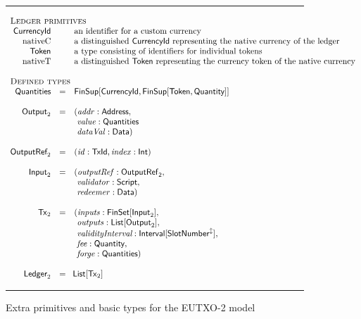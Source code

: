 \documentclass[a4paper]{article}
\renewcommand{\i}{\textit}  %
\newcommand{\s}{\textsf}  %
\newcommand{\msf}[1]{\ensuremath{\mathsf{#1}}}
\newcommand{\mi}[1]{\ensuremath{\mathit{#1}}}
\newcommand\rfskip{7pt}
\newenvironment{ruledfigure}[1]{\begin{figure}[#1]\hrule\vspace{\rfskip}}{\vspace{\rfskip}\hrule\end{figure}}
\newcommand{\List}[1]{\ensuremath{\s{List}[#1]}}
\newcommand{\FinSet}[1]{\ensuremath{\s{FinSet}[#1]}}
\newcommand{\Interval}[1]{\ensuremath{\s{Interval}[#1]}}
\newcommand{\extended}[1]{#1^\updownarrow}
\newcommand{\FinSup}[2]{\ensuremath{\s{FinSup}[#1,#2]}}
\newcommand{\script}{\ensuremath{\s{Script}}}
\newcommand{\TxId}{\ensuremath{\s{TxId}}}
\newcommand{\txrefid}{\mi{id}}
\newcommand{\Address}{\ensuremath{\s{Address}}}
\newcommand{\idx}{\mi{index}}
\newcommand{\inputs}{\mi{inputs}}
\newcommand{\outputs}{\mi{outputs}}
\newcommand{\forge}{\mi{forge}}
\newcommand{\fee}{\mi{fee}}
\newcommand{\addr}{\mi{addr}}
\newcommand{\val}{\mi{value}}  %
\newcommand{\validator}{\mi{validator}}
\newcommand{\redeemer}{\mi{redeemer}}
\newcommand{\dataval}{\mi{dataVal}}
\newcommand{\Data}{\ensuremath{\s{Data}}}
\newcommand{\outputref}{\mi{outputRef}}
\newcommand{\slotnum}{\ensuremath{\s{SlotNumber}}}
\newcommand{\eutxotx}{\msf{Tx}}
\newcommand{\qty}{\ensuremath{\s{Quantity}}}
\newcommand{\token}{\ensuremath{\s{Token}}}
\newcommand{\currency}{\ensuremath{\s{CurrencyId}}}
\newcommand{\nativeCur}{\ensuremath{\mathrm{nativeC}}}
\newcommand{\nativeTok}{\ensuremath{\mathrm{nativeT}}}
\newcommand{\qtymap}{\ensuremath{\s{Quantities}}}
\begin{document}
\begin{ruledfigure}{H}
  \begin{displaymath}
    \begin{array}{rll}
    \multicolumn{3}{l}{\textsc{Ledger primitives}}\\
    \currency  && \mbox{an identifier for a custom currency}\\
    \nativeCur && \mbox{a distinguished \currency{} representing the native currency of the ledger}\\
    \token     && \mbox{a type consisting of identifiers for individual tokens}\\
    \nativeTok && \mbox{a distinguished \token{} representing the currency token of the native currency}\\
    \\
    \multicolumn{3}{l}{\textsc{Defined types}}\\
    \qtymap   &=& \FinSup{\currency}{\FinSup{\token}{\qty}}\\
    \\
    \s{Output}_2 &=&(\addr: \Address,\\
                 & &\ \val: \qtymap\\
                 & &\ \dataval: \Data)\\
    \\
    \s{OutputRef}_2 &= &(\txrefid: \TxId, \idx: \s{Int})\\
    \\
    \s{Input}_2 &=&( \outputref: \sf{OutputRef}_2,\\
                & &\ \validator: \script,\\
                & &\ \redeemer: \Data)\\
    \\
    \eutxotx_2 &=&(\inputs: \FinSet{\s{Input}_2},\\
               & &\ \outputs: \List{\s{Output}_2},\\
               & &\ \i{validityInterval}: \Interval{\extended{\slotnum}},\\
               & &\ \fee: \qty,\\
               & &\ \forge: \qtymap)\\
    \\
    \s{Ledger}_2 &=&\!\List{\eutxotx_2}\\
    \end{array}
  \end{displaymath}
  \caption{Extra primitives and basic types for the EUTXO-2 model}
  \label{fig:eutxo-2-types}
\end{ruledfigure}
\end{document}
